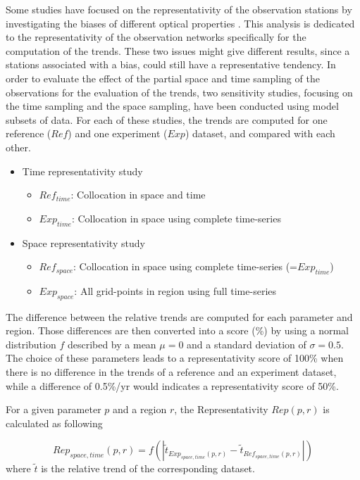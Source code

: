\documentclass[journal abbreviation, manuscript]{copernicus}
\begin{document}
Some studies have focused on the representativity of the observation stations by investigating the biases of different optical properties \citep{wang2017,schutgens2017spatio,schutgens2019site}. This analysis is dedicated to the  representativity of the observation networks specifically for the computation of the trends. These two issues might give different results, since a stations associated with a bias, could still have a representative tendency. In order to evaluate the effect of the partial space and time sampling of the observations for the evaluation of the trends, two sensitivity studies, focusing on the time sampling and the space sampling, have been conducted using model subsets of data. For each of these studies, the trends are computed for one reference ($Ref$) and one experiment ($Exp$) dataset, and compared with each other.
\begin{itemize}
 \item Time representativity study
       \begin{itemize}
        \item $Ref_{time}$: Collocation in space and time
        \item $Exp_{time}$: Collocation in space using complete time-series
       \end{itemize}
 \item Space representativity study
       \begin{itemize}
        \item $Ref_{space}$: Collocation in space using complete time-series (=$Exp_{time}$)
        \item $Exp_{space}$: All grid-points in region using full time-series
       \end{itemize}
\end{itemize}

The difference between the relative trends are computed for each parameter and region. Those differences are then converted into a score (\unit{\%}) by using a normal distribution $f$ described by a mean $\mu=0$ and a standard deviation of $\sigma=0.5$. The choice of these parameters leads to a representativity score of 100\% when there is no difference in the trends of a reference and an experiment dataset, while a difference of 0.5\%/yr would indicates a representativity score of 50\%.

For a given parameter $p$ and a region $r$, the Representativity $Rep(p,r)$ is calculated as following

\begin{equation}
 Rep_{space,time}(p, r) = {f\left(\left| \tilde{t}_{Exp_{space,time}(p, r)}-\tilde{t}_{Ref_{space,time}(p, r)} \right|\right)}
\end{equation}
where $\tilde{t}$ is the relative trend of the corresponding dataset.
\end{document}
